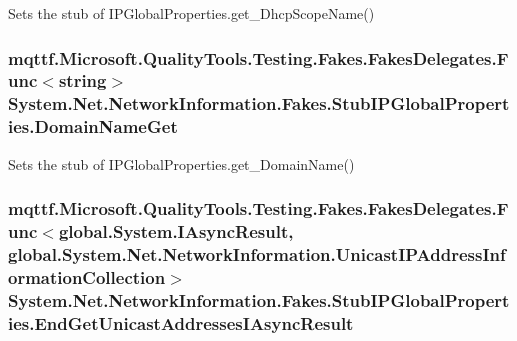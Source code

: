 Sets the stub of I\-P\-Global\-Properties.\-get\-\_\-\-Dhcp\-Scope\-Name()

\hypertarget{class_system_1_1_net_1_1_network_information_1_1_fakes_1_1_stub_i_p_global_properties_a2e7d7f85e1b431268492f99bee5f85c5}{
\subsubsection[{Domain\-Name\-Get}]{\setlength{\rightskip}{0pt plus 5cm}mqttf.\-Microsoft.\-Quality\-Tools.\-Testing.\-Fakes.\-Fakes\-Delegates.\-Func$<$string$>$ System.\-Net.\-Network\-Information.\-Fakes.\-Stub\-I\-P\-Global\-Properties.\-Domain\-Name\-Get}}\label{class_system_1_1_net_1_1_network_information_1_1_fakes_1_1_stub_i_p_global_properties_a2e7d7f85e1b431268492f99bee5f85c5}


Sets the stub of I\-P\-Global\-Properties.\-get\-\_\-\-Domain\-Name()

\hypertarget{class_system_1_1_net_1_1_network_information_1_1_fakes_1_1_stub_i_p_global_properties_a5afb74fb9f784593bb2cec5e6b6eb21a}{
\subsubsection[{End\-Get\-Unicast\-Addresses\-I\-Async\-Result}]{\setlength{\rightskip}{0pt plus 5cm}mqttf.\-Microsoft.\-Quality\-Tools.\-Testing.\-Fakes.\-Fakes\-Delegates.\-Func$<$global.\-System.\-I\-Async\-Result, global.\-System.\-Net.\-Network\-Information.\-Unicast\-I\-P\-Address\-Information\-Collection$>$ System.\-Net.\-Network\-Information.\-Fakes.\-Stub\-I\-P\-Global\-Properties.\-End\-Get\-Unicast\-Addresses\-I\-Async\-Result}}\label{class_system_1_1_net_1_1_network_information_1_1_fakes_1_1_stub_i_p_global_properties_a5afb74fb9f784593bb2cec5e6b6eb21a}



